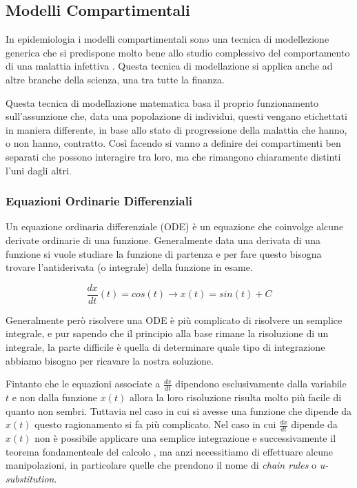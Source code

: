 \subsection{Modelli Compartimentali}
In epidemiologia i modelli compartimentali sono una tecnica di modellezione 
generica che si predispone molto bene allo studio complessivo del comportamento
di una malattia infettiva \cite{wiki:Compartmental_models_in_epidemiology}. 
Questa tecnica di modellazione si applica anche ad altre branche della 
scienza, una tra tutte la finanza.

Questa tecnica di modellazione matematica basa il proprio funzionamento 
sull'assunzione che, data una popolazione di individui, questi vengano 
etichettati in maniera differente, in base allo stato di progressione 
della malattia che hanno, o non hanno, contratto. Così facendo si vanno a 
definire dei compartimenti ben separati che possono interagire tra loro, ma 
che rimangono chiaramente distinti l'uni dagli altri.

\subsubsection*{Equazioni Ordinarie Differenziali}
Un equazione ordinaria differenziale (ODE) è un equazione che coinvolge alcune derivate
ordinarie di una funzione. \cite{wiki:Equazione_differenziale_ordinaria} Generalmente data una 
derivata di una funzione si vuole studiare la funzione di partenza e per fare questo bisogna trovare 
l'antiderivata (o integrale) della funzione in esame. 

$$\frac{dx}{dt}(t) = cos(t) \rightarrow x(t) = sin(t) + C$$

Generalmente però risolvere una ODE è più complicato di risolvere un semplice integrale, e pur sapendo 
che il principio alla base rimane la risoluzione di un integrale, la parte difficile è quella di determinare
quale tipo di integrazione abbiamo bisogno per ricavare la nostra soluzione.

Fintanto che le equazioni associate a $\frac{dx}{dt}$ dipendono esclusivamente dalla variabile $t$ e non 
dalla funzione $x(t)$ allora la loro risoluzione risulta molto più facile di quanto non sembri. Tuttavia 
nel caso in cui si avesse una funzione che dipende da $x(t)$ questo ragionamento si fa più complicato.
Nel caso in cui $\frac{dx}{dt}$ dipende da $x(t)$ non è possibile applicare una semplice integrazione e 
successivamente il teorema fondamenteale del calcolo \cite{wiki:Fundamental_theorem_of_calculus}, ma anzi 
necessitiamo di effettuare alcune manipolazioni, in particolare quelle che prendono il nome di \emph{chain rules}
o \emph{u-substitution}.

